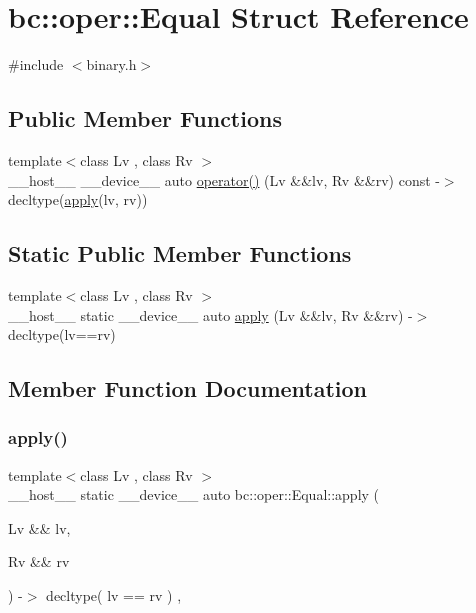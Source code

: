 \hypertarget{structbc_1_1oper_1_1Equal}{}\section{bc\+:\+:oper\+:\+:Equal Struct Reference}
\label{structbc_1_1oper_1_1Equal}


{\ttfamily \#include $<$binary.\+h$>$}

\subsection*{Public Member Functions}
\begin{DoxyCompactItemize}
\item 
{\footnotesize template$<$class Lv , class Rv $>$ }\\\+\_\+\+\_\+host\+\_\+\+\_\+ \+\_\+\+\_\+device\+\_\+\+\_\+ auto \hyperlink{structbc_1_1oper_1_1Equal_acd42caec9e367215f0f3bbc224d8528d}{operator()} (Lv \&\&lv, Rv \&\&rv) const -\/$>$ decltype(\hyperlink{structbc_1_1oper_1_1Equal_a7802e80388c013e0af1436d6273914f4}{apply}(lv, rv))
\end{DoxyCompactItemize}
\subsection*{Static Public Member Functions}
\begin{DoxyCompactItemize}
\item 
{\footnotesize template$<$class Lv , class Rv $>$ }\\\+\_\+\+\_\+host\+\_\+\+\_\+ static \+\_\+\+\_\+device\+\_\+\+\_\+ auto \hyperlink{structbc_1_1oper_1_1Equal_a7802e80388c013e0af1436d6273914f4}{apply} (Lv \&\&lv, Rv \&\&rv) -\/$>$ decltype(lv==rv)
\end{DoxyCompactItemize}


\subsection{Member Function Documentation}
\mbox{\label{structbc_1_1oper_1_1Equal_a7802e80388c013e0af1436d6273914f4}} 
\subsubsection{\texorpdfstring{apply()}{apply()}}
{\footnotesize\ttfamily template$<$class Lv , class Rv $>$ \\
\+\_\+\+\_\+host\+\_\+\+\_\+ static \+\_\+\+\_\+device\+\_\+\+\_\+ auto bc\+::oper\+::\+Equal\+::apply (\begin{DoxyParamCaption}\item[{Lv \&\&}]{lv,  }\item[{Rv \&\&}]{rv }\end{DoxyParamCaption}) -\/$>$ decltype( lv == rv ) \hspace{0.3cm}{\ttfamily [inline]}, {\ttfamily [static]}}

